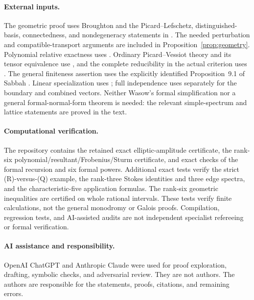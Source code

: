 \documentclass[11pt]{article}
\numberwithin{equation}{section}
\theoremstyle{definition}
\theoremstyle{remark}
\begin{document}
\paragraph{External inputs.}
The geometric proof uses Broughton \cite[Definition~3.1, Theorem~1.2,
pp.~229--231]{Br} and the Picard--Lefschetz, distinguished-basis,
connectedness, and nondegeneracy statements in
\cite[\S1.3; \S2.1; Theorem~3.3; pp.~100, 411]{AGV}.
The needed perturbation and compatible-transport arguments are included
in Proposition~\ref{prop:geometry}. Polynomial relative exactness uses
\cite[Definitions~1.3--1.4, Theorem~1.5]{Bonnet}.
Ordinary Picard--Vessiot theory and its tensor equivalence use
\cite[Theorem~1.5.2]{Singer}, and the complete reducibility in the actual
criterion uses \cite[Proposition~15.15, Corollary~22.43]{MilneAG}.
The general finiteness assertion uses the explicitly identified
Proposition~9.1 of Sabbah \cite{Sabbah}.
Linear specialization uses \cite[Theorem~3.2]{Beukers}; full independence
uses \cite[Theorem~1.1]{Beukers} separately for the boundary and combined
vectors. Neither Wasow's formal simplification
nor a general formal-normal-form theorem is needed: the relevant
simple-spectrum and lattice statements are proved in the text.

\paragraph{Computational verification.}
The repository contains the retained exact elliptic-amplitude certificate,
the rank-six polynomial/resultant/Frobenius/Sturm certificate, and exact
checks of the formal recursion and six formal powers. Additional exact tests
verify the strict (R)-versus-(Q) example, the rank-three Stokes identities and
three edge spectra, and the characteristic-five application formulas. The rank-six
geometric inequalities are certified on whole rational intervals.
These tests verify finite calculations, not the general monodromy or
Galois proofs. Compilation, regression tests, and AI-assisted audits are
not independent specialist refereeing or formal verification.

\paragraph{AI assistance and responsibility.}
OpenAI ChatGPT and Anthropic Claude were used for proof exploration,
drafting, symbolic checks, and adversarial review. They are not authors.
The authors are responsible for the statements, proofs, citations, and
remaining errors.
\end{document}
